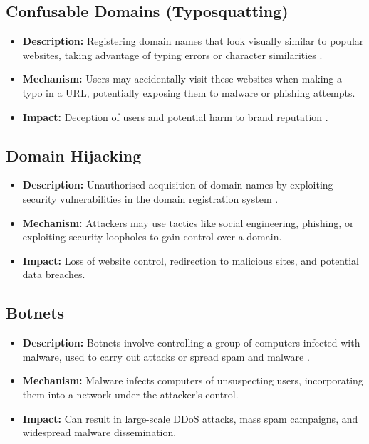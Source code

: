 \subsection{Confusable Domains (Typosquatting)}
\begin{itemize}
    \item \textbf{Description:} Registering domain names that look visually similar to popular websites, taking advantage of typing errors or character similarities \cite{inta2023dnstypo}.
    \item \textbf{Mechanism:} Users may accidentally visit these websites when making a typo in a URL, potentially exposing them to malware or phishing attempts.
    \item \textbf{Impact:} Deception of users and potential harm to brand reputation \cite{edelman2008typosquatting}.
\end{itemize}

\subsection{Domain Hijacking}
\begin{itemize}
    \item \textbf{Description:} Unauthorised acquisition of domain names by exploiting security vulnerabilities in the domain registration system \cite{inta2023dnstypo}.
    \item \textbf{Mechanism:} Attackers may use tactics like social engineering, phishing, or exploiting security loopholes to gain control over a domain.
    \item \textbf{Impact:} Loss of website control, redirection to malicious sites, and potential data breaches.
\end{itemize}

\subsection{Botnets}
\begin{itemize}
    \item \textbf{Description:} Botnets involve controlling a group of computers infected with malware, used to carry out attacks or spread spam and malware \cite{citpyour}.
    \item \textbf{Mechanism:} Malware infects computers of unsuspecting users, incorporating them into a network under the attacker's control.
    \item \textbf{Impact:} Can result in large-scale DDoS attacks, mass spam campaigns, and widespread malware dissemination.
\end{itemize}

